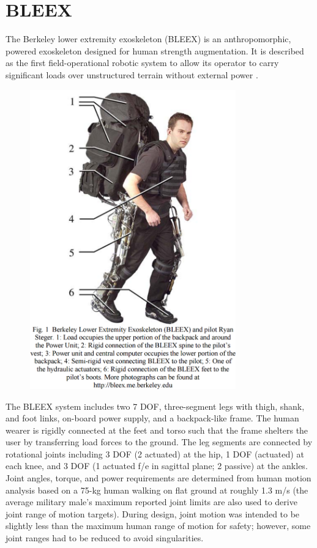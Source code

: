 \section{BLEEX}
\label{exo:bleex}
\begin{refsection}


The Berkeley lower extremity exoskeleton (BLEEX) is an anthropomorphic, powered exoskeleton designed for human strength augmentation.  It is described as the first field-operational robotic system to allow its operator to carry significant loads over unstructured terrain without external power \cite{bleex_design_2006}.

\begin{figure}[ht]
  \centering
  \includegraphics[width=3.5in]{exos/figs/bleex_exo.png}
\end{figure}

The BLEEX system includes two 7 DOF, three-segment legs with thigh, shank, and foot links, on-board power supply, and a backpack-like frame.  The human wearer is rigidly connected at the feet and torso such that the frame shelters the user by transferring load forces to the ground.  The leg segments are connected by rotational joints including 3 DOF (2 actuated) at the hip, 1 DOF (actuated) at each knee, and 3 DOF (1 actuated f/e in sagittal 
plane; 2 passive) at the ankles.  Joint angles, torque, and power requirements are determined from human motion analysis based on a 75-kg human walking on flat ground at roughly 1.3 m/s (the average military male's maximum reported joint limits are also used to derive joint range of motion targets).  During design, joint motion was intended to be slightly less than the maximum human range of motion for safety; however, some joint ranges had to be reduced to avoid singularities.


\end{refsection}

